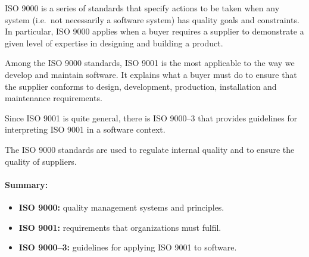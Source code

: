 ISO 9000 is a series of standards that specify actions to be taken when any
system (i.e.\ not necessarily a software system) has quality goals and
constraints. In particular, ISO 9000 applies when a buyer requires a supplier
to demonstrate a given level of expertise in designing and building a product.
\newline

Among the ISO 9000 standards, ISO 9001 is the most applicable to the way we develop and
maintain software. It explains what a buyer must do to ensure that the supplier conforms to
design, development, production, installation and maintenance requirements.
\newline

Since ISO 9001 is quite general, there is ISO 9000--3 that provides guidelines for interpreting
ISO 9001 in a software context.
\newline

The ISO 9000 standards are used to regulate internal quality and to ensure the quality of
suppliers.
\newline

\paragraph{Summary:}
\begin{itemize}
    \item \textbf{ISO 9000:} quality management systems and principles.
    \item \textbf{ISO 9001:} requirements that organizations must fulfil.
    \item \textbf{ISO 9000--3:} guidelines for applying ISO 9001 to software.
\end{itemize}
